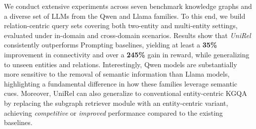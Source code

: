 We conduct extensive experiments across seven benchmark knowledge graphs and a diverse set of LLMs from the Qwen and Llama families.
To this end, we build relation-centric query sets covering both two-entity and multi-entity settings, evaluated under in-domain and cross-domain scenarios.
Results show that \textit{UniRel} consistently outperforms Prompting baselines, yielding at least a \textbf{35\%} improvement in connectivity and over a \textbf{245\%} gain in reward, while generalizing to unseen entities and relations.
Interestingly, Qwen models are substantially more sensitive to the removal of semantic information than Llama models, highlighting a fundamental difference in how these families leverage semantic cues. 
Moreover, UniRel can also generalize to conventional entity-centric KGQA by replacing the subgraph retriever module with an entity-centric variant, achieving \textit{competitive} or \textit{improved} performance compared to the existing baselines.
